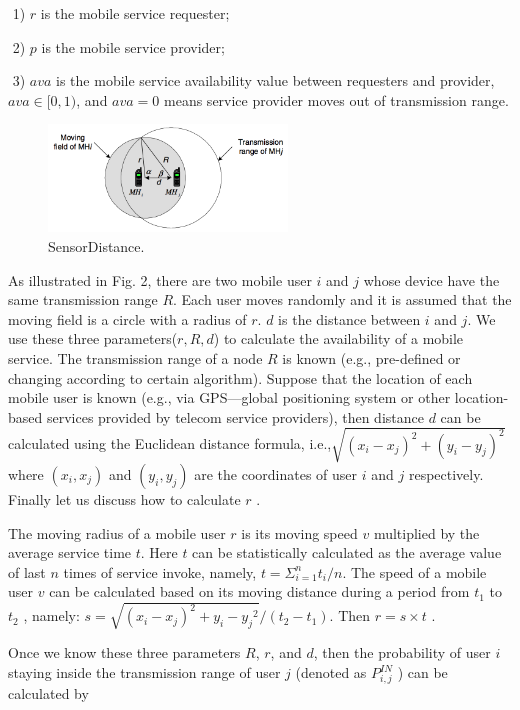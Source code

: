 \documentclass[10pt,journal,compsoc]{IEEEtran}
\begin{document}
​	1) $r$ is the mobile service requester;

​	2) $p$ is the mobile service provider;

​	3) $ava$ is the mobile service availability value between requesters and provider, $ava \in [0,1)$, and $ava=0$ means service provider moves out of transmission range.


\begin{figure}[!t]
\centering
\includegraphics[width=2.5in]{./img/fig3.png}
\caption{SensorDistance.}
\label{fig_sim}
\end{figure}

As illustrated in Fig. 2, there are two mobile user $i$ and $j$ whose device have the same transmission range $R$. Each user moves randomly and it is assumed that the moving field is a circle with a radius of $r$. $d$ is the distance between $i$ and $j$. We use these three parameters($r,R,d$) to calculate the availability of a mobile service. The transmission range of a node $R$ is known (e.g., pre-defined or changing according to certain algorithm). Suppose that the location of each mobile user is known (e.g., via GPS—global positioning system or other location-based services provided by telecom service providers\cite{chadil2008real}), then distance $d$ can be calculated using the Euclidean distance formula, i.e.,$\sqrt{{(x_i-x_j)^2}+({y_i-y_j})^2}$ where $(x_i, x_j)$ and $(y_i, y_j)$ are the coordinates of user $i$ and $j$ respectively. Finally let us discuss how to calculate $r$ \cite{Yang2010}.

The moving radius of a mobile user $r$ is its moving speed $v$ multiplied by the average service time $t$. Here $t$ can be statistically calculated as the average value of last $n$ times of service invoke, namely, $t = \Sigma_{i=1}^{n}t_i/n$. The speed of a mobile user $v$ can be calculated based on its moving distance during a period from $t_1$ to $t_2$ \cite{ko2000location}, namely: $s = \sqrt{{(x_i-x_j)^2}+{y_i-y_j}^2}/(t_2-t_1)$. Then $r = s \times t$ \cite{Yang2010}.

​Once we know these three parameters $R$, $r$, and $d$, then the probability of user $i$ staying inside the transmission range of user $j$ (denoted as $P_{i,j}^{IN}$ ) can be calculated by
\end{document}
